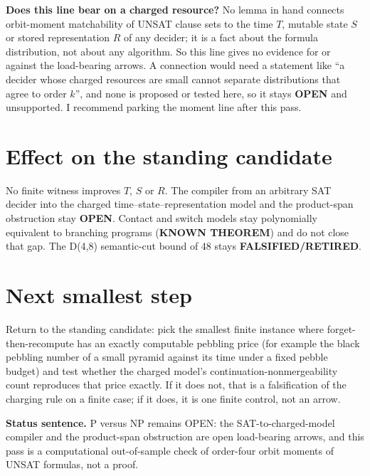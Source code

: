 \documentclass[11pt]{article}
\begin{document}
\textbf{Does this line bear on a charged resource?} No lemma in hand connects orbit-moment matchability of UNSAT clause sets to the time $T$, mutable state $S$ or stored representation $R$ of any decider; it is a fact about the formula distribution, not about any algorithm. So this line gives no evidence for or against the load-bearing arrows. A connection would need a statement like ``a decider whose charged resources are small cannot separate distributions that agree to order $k$'', and none is proposed or tested here, so it stays \textbf{OPEN} and unsupported. I recommend parking the moment line after this pass.

\section*{Effect on the standing candidate}
No finite witness improves $T$, $S$ or $R$. The compiler from an arbitrary SAT decider into the charged time--state--representation model and the product-span obstruction stay \textbf{OPEN}. Contact and switch models stay polynomially equivalent to branching programs (\textbf{KNOWN THEOREM}) and do not close that gap. The D(4,8) semantic-cut bound of 48 stays \textbf{FALSIFIED/RETIRED}.

\section*{Next smallest step}
Return to the standing candidate: pick the smallest finite instance where forget-then-recompute has an exactly computable pebbling price (for example the black pebbling number of a small pyramid against its time under a fixed pebble budget) and test whether the charged model's continuation-nonmergeability count reproduces that price exactly. If it does not, that is a falsification of the charging rule on a finite case; if it does, it is one finite control, not an arrow.

\bigskip
\noindent\textbf{Status sentence.} P versus NP remains OPEN: the SAT-to-charged-model compiler and the product-span obstruction are open load-bearing arrows, and this pass is a computational out-of-sample check of order-four orbit moments of UNSAT formulas, not a proof.
\end{document}
